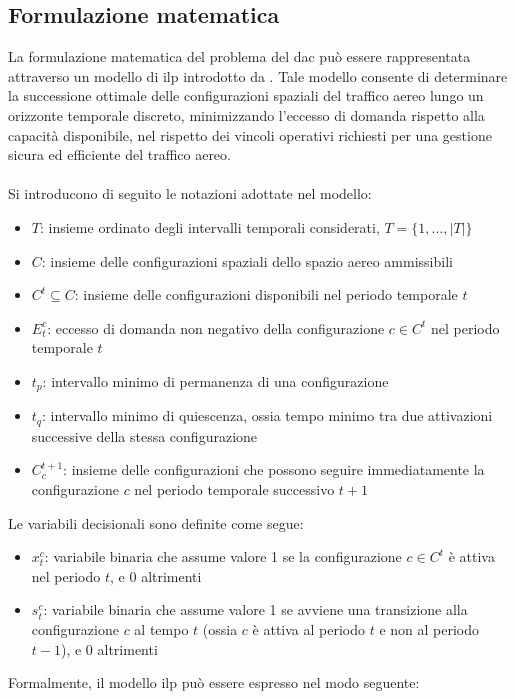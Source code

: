 \subsection{Formulazione matematica}
\label{sec:dac_math}
La formulazione matematica del problema del \gls{dac} può essere rappresentata attraverso un modello di \gls{ilp} introdotto da \citet{galeazzo2024integer}. Tale modello consente di determinare la successione ottimale delle configurazioni spaziali del traffico aereo lungo un orizzonte temporale discreto, minimizzando l'eccesso di domanda rispetto alla capacità disponibile, nel rispetto dei vincoli operativi richiesti per una gestione sicura ed efficiente del traffico aereo.\\\\
Si introducono di seguito le notazioni adottate nel modello:
\begin{itemize}
    \item $T$: insieme ordinato degli intervalli temporali considerati, $T = \{1, \dots, |T|\}$
    \item $C$: insieme delle configurazioni spaziali dello spazio aereo ammissibili
    \item $C^t \subseteq C$: insieme delle configurazioni disponibili nel periodo temporale $t$
    \item $E^c_t$: eccesso di domanda non negativo della configurazione $c \in C^t$ nel periodo temporale $t$
    \item $t_p$: intervallo minimo di permanenza di una configurazione
    \item $t_q$: intervallo minimo di quiescenza, ossia tempo minimo tra due attivazioni successive della stessa configurazione
    \item $C_{c}^{t+1}$: insieme delle configurazioni che possono seguire immediatamente la configurazione $c$ nel periodo temporale successivo $t+1$
\end{itemize}
    Le variabili decisionali sono definite come segue:
    \begin{itemize}
        \item $x^c_t$: variabile binaria che assume valore 1 se la configurazione $c \in C^t$ è attiva nel periodo $t$, e 0 altrimenti
        \item $s^c_t$: variabile binaria che assume valore 1 se avviene una transizione alla configurazione $c$ al tempo $t$ (ossia $c$ è attiva al periodo $t$ e non al periodo $t-1$), e 0 altrimenti
    \end{itemize}
    Formalmente, il modello \gls{ilp} può essere espresso nel modo seguente:
